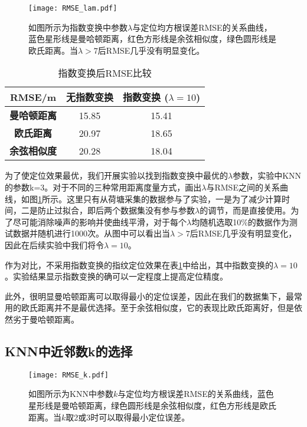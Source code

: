 \begin{figure}[tb]
\centering
\texttt{[image: RMSE\_lam.pdf]}
\caption{如图所示为指数变换中参数$\lambda$与定位均方根误差RMSE的关系曲线，蓝色星形线是曼哈顿距离，红色方形线是余弦相似度，绿色圆形线是欧氏距离。当$\lambda>7$后RMSE几乎没有明显变化。}
\label{fig:rmse_lam}
\end{figure}

\begin{table}[tbp]
	\caption{指数变换后RMSE比较}
	\begin{center}
		\begin{tabular}{ccc}
			\toprule
			\textbf{RMSE/m} & \textbf{无指数变换} & \textbf{指数变换 ($\lambda=10$)} \\
			\midrule
			\textbf{曼哈顿距离} & 15.85 & 15.41 \\
			\midrule
			\textbf{欧氏距离} & 20.97 & 18.65 \\
			\midrule
			\textbf{余弦相似度} & 20.28 & 18.04 \\
			\bottomrule
		\end{tabular}
		\label{tab:no_exp}
	\end{center}
\end{table}

为了使定位效果最优，我们开展实验以找到指数变换中最优的$\lambda$参数，实验中KNN的参数k=3。对于不同的三种常用距离度量方式，画出$\lambda$与RMSE之间的关系曲线，如图\ref{fig:rmse_lam}所示。这里只有从荷塘采集的数据参与了实验，一是为了减少计算时间，二是防止过拟合，即后两个数据集没有参与参数$\lambda$的调节，而是直接使用。为了尽可能消除噪声的影响并使曲线平滑，对于每个$\lambda$均随机选取10\%的数据作为测试数据并随机进行1000次。从图中可以看出当$\lambda>7$后RMSE几乎没有明显变化，因此在后续实验中我们将令$\lambda=10$。

作为对比，不采用指数变换的指纹定位效果在表\ref{tab:no_exp}中给出，其中指数变换的$\lambda=10$。实验结果显示指数变换的确可以一定程度上提高定位精度。

此外，很明显曼哈顿距离可以取得最小的定位误差，因此在我们的数据集下，最常用的欧氏距离并不是最优选择。至于余弦相似度，它的表现比欧氏距离好，但是依然劣于曼哈顿距离。

\subsection{KNN中近邻数k的选择}

\begin{figure}[tb]
	\centering
	\texttt{[image: RMSE\_k.pdf]}
	\caption{如图所示为KNN中参数$k$与定位均方根误差RMSE的关系曲线，蓝色星形线是曼哈顿距离，绿色圆形线是余弦相似度，红色方形线是欧氏距离。当$k$取2或3时可以取得最小定位误差。}
	\label{fig:rmse_k}
\end{figure}


